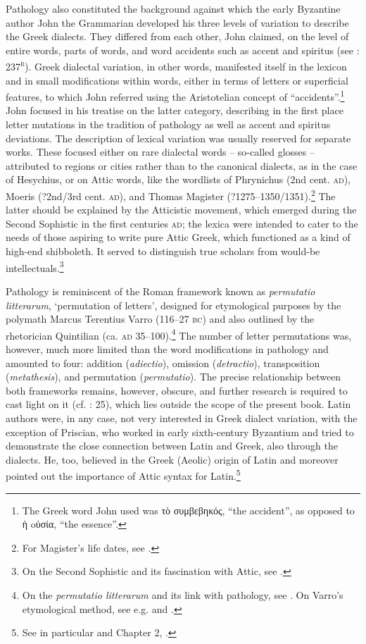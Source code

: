 Pathology also constituted the background against which the early Byzantine author John the Grammarian developed his three levels of variation to describe the Greek dialects. They differed from each other, John claimed, on the level of entire words, parts of words, and word accidents such as accent and spiritus (see \citealt{Manutius1496Thesaurus}: 237\textsc{\textsuperscript{r}}). Greek dialectal variation, in other words, manifested itself in the lexicon and in small modifications within words, either in terms of letters or superficial features, to which John referred using the Aristotelian concept of “accidents”.\footnote{The Greek word John used was τὸ συμβεβηκός, “the accident”, as opposed to ἡ oὐσία, “the essence”.} John focused in his treatise on the latter category, describing in the first place letter mutations in the tradition of pathology as well as accent and spiritus deviations. The description of lexical variation was usually reserved for separate works. These focused either on rare dialectal words – so-called glosses – attributed to regions or cities rather than to the canonical dialects, as in the case of Hesychius, or on Attic words, like the wordlists of Phrynichus (2nd cent. \textsc{ad}), Moeris (?2nd/3rd cent. \textsc{ad}), and Thomas Magister (?1275–1350/1351).\footnote{{For Magister’s life dates, see \citet[417]{Baloglou1998}.}} The latter should be explained by the Atticistic movement, which emerged during the Second Sophistic in the first centuries \textsc{ad}; the lexica were intended to cater to the needs of those aspiring to write pure Attic Greek, which functioned as a kind of high-end shibboleth. It served to distinguish true scholars from would-be intellectuals.\footnote{On the Second Sophistic and its fascination with Attic, see \citet{Whitmarsh2005}.}



Pathology is reminiscent of the Roman framework known as \textit{permutatio litterarum}, ‘permutation of letters’, designed for etymological purposes by the polymath Marcus Terentius Varro (116–27 \textsc{bc}) and also outlined by the rhetorician Quintilian (ca. \textsc{ad} 35–100).\footnote{{On the} {\textit{permutatio litterarum} }{and its link with pathology, see \citet[esp. 25–28, 37]{Ax1987}. On Varro’s etymological method, see e.g. \citet{Pfaffel1981} and \citet[7--10, {\textit{passim}}]{Taylor1996}.}} The number of letter permutations was, however, much more limited than the word modifications in pathology and amounted to four: addition (\textit{adiectio}), omission (\textit{detractio}), transposition (\textit{metathesis}), and permutation (\textit{permutatio}). The precise relationship between both frameworks remains, however, obscure, and further research is required to cast light on it (cf. \citealt{Ax1987}: 25), which lies outside the scope of the present book. Latin authors were, in any case, not very interested in Greek dialect variation, with the exception of Priscian, who worked in early sixth-century Byzantium and tried to demonstrate the close connection between Latin and Greek, also through the dialects. He, too, believed in the Greek (Aeolic) origin of Latin and moreover pointed out the importance of Attic syntax for Latin.\footnote{{See in particular \citet[]{Conduche_latin_nodate} and Chapter 2, .}}


